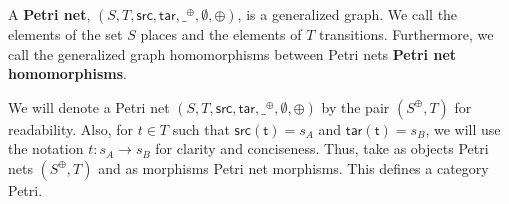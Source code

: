 %
\begin{definition}
  \label{def:Petri-Net}
  A \textbf{Petri net}, $(S, T, \mathsf{src},
  \mathsf{tar},\_^{\oplus},\emptyset,\oplus)$, is a generalized graph.  We call
  the elements of the set $S$ places and the elements of $T$
  transitions.  Furthermore, we call the generalized graph
  homomorphisms between Petri nets \textbf{Petri net homomorphisms}.
\end{definition}
We will denote a Petri net $(S, T, \mathsf{src},
\mathsf{tar},\_^{\oplus},\emptyset,\oplus)$ by the pair $(S^\oplus,T)$ for
readability. Also, for $t \in T$ such that $\mathsf{src(t)} = s_A$ and $\mathsf{tar(t)} = s_B$, we will use the notation $t : s_A \rightarrow s_B$ for clarity and conciseness. 
%
%
%
Thus, take as objects Petri nets $(S^\oplus, T)$ and as morphisms Petri net morphisms. This defines a category Petri.
